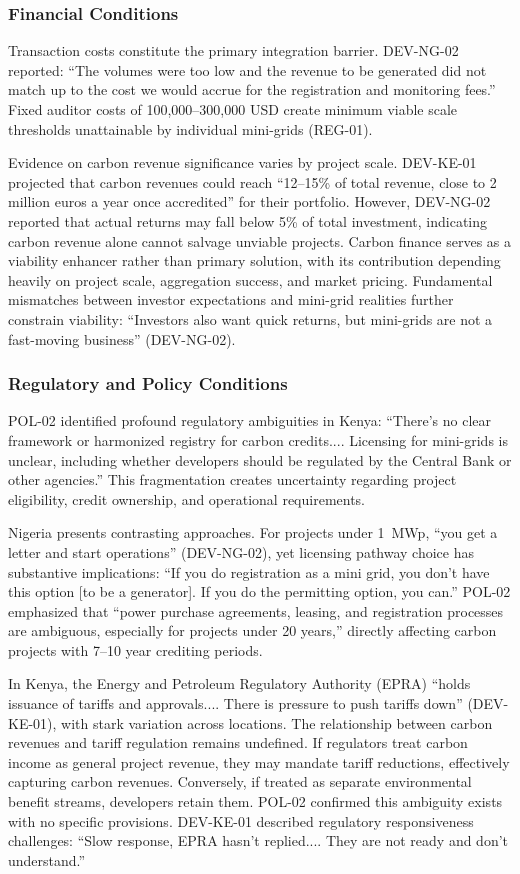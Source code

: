 \subsubsection{Financial Conditions}
Transaction costs constitute the primary integration barrier. DEV-NG-02 reported: ``The volumes were too low and the revenue to be generated did not match up to the cost we would accrue for the registration and monitoring fees.'' Fixed auditor costs of 100,000--300,000 USD create minimum viable scale thresholds unattainable by individual mini-grids (REG-01).

Evidence on carbon revenue significance varies by project scale. DEV-KE-01 projected that carbon revenues could reach ``12--15\% of total revenue, close to 2 million euros a year once accredited'' for their portfolio. However, DEV-NG-02 reported that actual returns may fall below 5\% of total investment, indicating carbon revenue alone cannot salvage unviable projects. Carbon finance serves as a viability enhancer rather than primary solution, with its contribution depending heavily on project scale, aggregation success, and market pricing. Fundamental mismatches between investor expectations and mini-grid realities further constrain viability: ``Investors also want quick returns, but mini-grids are not a fast-moving business'' (DEV-NG-02).

\subsubsection{Regulatory and Policy Conditions}
POL-02 identified profound regulatory ambiguities in Kenya: ``There's no clear framework or harmonized registry for carbon credits.... Licensing for mini-grids is unclear, including whether developers should be regulated by the Central Bank or other agencies.'' This fragmentation creates uncertainty regarding project eligibility, credit ownership, and operational requirements.

Nigeria presents contrasting approaches. For projects under 1~MWp, ``you get a letter and start operations'' (DEV-NG-02), yet licensing pathway choice has substantive implications: ``If you do registration as a mini grid, you don't have this option [to be a generator]. If you do the permitting option, you can.'' POL-02 emphasized that ``power purchase agreements, leasing, and registration processes are ambiguous, especially for projects under 20 years,'' directly affecting carbon projects with 7--10 year crediting periods.

In Kenya, the Energy and Petroleum Regulatory Authority (EPRA) ``holds issuance of tariffs and approvals.... There is pressure to push tariffs down'' (DEV-KE-01), with stark variation across locations. The relationship between carbon revenues and tariff regulation remains undefined. If regulators treat carbon income as general project revenue, they may mandate tariff reductions, effectively capturing carbon revenues. Conversely, if treated as separate environmental benefit streams, developers retain them. POL-02 confirmed this ambiguity exists with no specific provisions. DEV-KE-01 described regulatory responsiveness challenges: ``Slow response, EPRA hasn't replied.... They are not ready and don't understand.''

